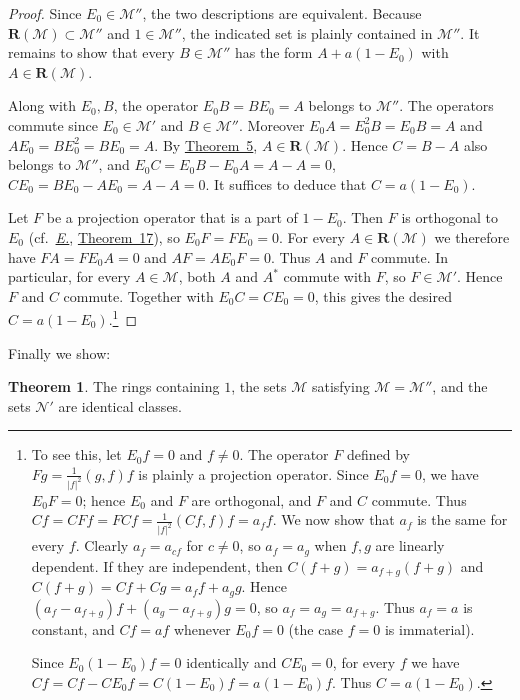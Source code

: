 \documentclass[
  paper=b5,
  twoside=true,
  fontsize=13pt,
  headings=normal,
  bookmarkpackage=false
]{scrartcl}
\theoremstyle{definition}
\newtheorem{theorem}{Theorem}
\newcommand{\TheoremRef}[1]{\hyperref[thm:#1]{Theorem~#1}}
\newcommand{\Eref}{\hyperref[fn:E-paper]{\emph{E.}}}
\newcommand{\ErefText}[1]{\href{https://doi.org/10.1007/BF01782338}{#1}}
\newcommand{\GeneratedRing}{\boldsymbol{R}}
\begin{document}
\begin{proof}
Since \(E_0\in\mathcal M''\), the two descriptions are equivalent.
Because \(\GeneratedRing (\mathcal M)\subset\mathcal M''\) and \(1\in\mathcal M''\),
the indicated set is plainly contained in \(\mathcal M''\). It remains
to show that every \(B\in\mathcal M''\) has the form \(A+a(1-E_0)\)
with \(A\in \GeneratedRing (\mathcal M)\).

Along with \(E_0,B\), the operator \(E_0B=BE_0=A\) belongs to
\(\mathcal M''\). The operators commute since \(E_0\in\mathcal M'\) and
\(B\in\mathcal M''\). Moreover \(E_0A=E_0^2B=E_0B=A\) and
\(AE_0=BE_0^2=BE_0=A\). By \TheoremRef{5}, \(A\in \GeneratedRing (\mathcal M)\).
Hence \(C=B-A\) also belongs to \(\mathcal M''\), and
\(E_0C=E_0B-E_0A=A-A=0\), \(CE_0=BE_0-AE_0=A-A=0\). It suffices to
deduce that \(C=a(1-E_0)\).

Let \(F\) be a projection operator that is a part of \(1-E_0\). Then
\(F\) is orthogonal to \(E_0\) (cf.\ \Eref, \ErefText{Theorem~17}), so
\(E_0F=FE_0=0\). For every \(A\in \GeneratedRing (\mathcal M)\) we therefore have
\(FA=FE_0A=0\) and \(AF=AE_0F=0\). Thus \(A\) and \(F\) commute. In
particular, for every \(A\in\mathcal M\), both \(A\) and \(A^*\) commute
with \(F\), so \(F\in\mathcal M'\). Hence \(F\) and \(C\) commute.
Together with \(E_0C=CE_0=0\), this gives the desired
\(C=a(1-E_0)\).\footnote{\label{fn:53}To see this, let \(E_0f=0\) and
\(f\ne0\). The operator \(F\) defined by \(Fg=\frac{1}{|f|^2}(g,f)f\)
is plainly a projection operator. Since \(E_0f=0\), we have \(E_0F=0\);
hence \(E_0\) and \(F\) are orthogonal, and \(F\) and \(C\) commute.
Thus \(Cf=CFf=FCf=\frac{1}{|f|^2}(Cf,f)f=a_f f\).
We now show that \(a_f\) is the same for every \(f\). Clearly
\(a_f=a_{cf}\) for \(c\ne0\), so \(a_f=a_g\) when \(f,g\) are linearly
dependent. If they are independent, then
\(C(f+g)=a_{f+g}(f+g)\) and \(C(f+g)=Cf+Cg=a_ff+a_gg\). Hence
\((a_f-a_{f+g})f+(a_g-a_{f+g})g=0\), so \(a_f=a_g=a_{f+g}\).
Thus \(a_f=a\) is constant, and \(Cf=af\) whenever \(E_0f=0\)
(the case \(f=0\) is immaterial).

Since \(E_0(1-E_0)f=0\) identically and \(CE_0=0\), for every \(f\) we
have \(Cf=Cf-CE_0f=C(1-E_0)f=a(1-E_0)f\). Thus \(C=a(1-E_0)\).}
\end{proof}

Finally we show:

\begin{theorem}\label{thm:8}
The rings containing \(1\), the sets \(\mathcal M\) satisfying
\(\mathcal M=\mathcal M''\), and the sets \(\mathcal N'\) are identical
classes.
\end{theorem}
\end{document}
